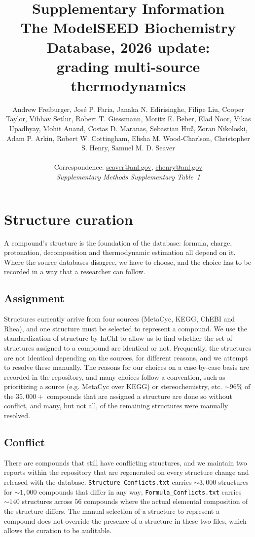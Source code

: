 \documentclass[11pt]{article}
\title{Supplementary Information\\[0.35em]
\large The ModelSEED Biochemistry Database, 2026 update:\\
grading multi-source thermodynamics}
\author{\begin{minipage}{0.86\textwidth}\centering\normalsize
Andrew Freiburger, Jos\'e P. Faria, Janaka N. Edirisinghe,
Filipe Liu, Cooper Taylor, Vibhav Setlur, Robert T. Giessmann, Moritz E. Beber,
Elad Noor, Vikas Upadhyay, Mohit Anand, Costas D. Maranas, Sebastian Hu{\ss},
Zoran Nikoloski, Adam P. Arkin, Robert W. Cottingham, Elisha M. Wood-Charlson,
Christopher S. Henry, Samuel M. D. Seaver
\end{minipage}\\[0.9em]
\small Correspondence: \href{mailto:seaver@anl.gov}{seaver@anl.gov},
\href{mailto:chenry@anl.gov}{chenry@anl.gov}\\[0.35em]
\small\itshape Supplementary Methods \DIFdelbegin \DIFdel{S1--S4 and }\DIFdelend \DIFaddbegin \DIFadd{S1--S5, }\DIFaddend Supplementary Table~1 \DIFaddbegin \DIFadd{and Supplementary Figure~S1}\DIFaddend }
\date{}
\begin{document}
\maketitle

\section{Structure curation}\label{sec:s1}

A compound's structure is the foundation of the database: formula, charge, protonation, decomposition and thermodynamic estimation all depend on it. Where the source databases disagree, we have to choose, and the choice has to be recorded in a way that a researcher can follow.

\subsection{Assignment} Structures currently arrive from four sources (MetaCyc, KEGG, ChEBI and Rhea), and one structure must be selected to represent a compound. We use the standardization of structure by InChI to allow us to find whether the set of structures assigned to a compound are identical or not. Frequently, the structures are not identical depending on the sources, for different reasons, and we attempt to resolve these manually. The reasons for our choices on a case-by-case basis are recorded in the repository, and many choices follow a convention, such as prioritizing a source (e.g. MetaCyc over KEGG) or stereochemistry, etc. $\sim96\%$ of the $35,000+$ compounds that are assigned a structure are done so without conflict, and many, but not all, of the remaining structures were manually resolved.

\subsection{Conflict} There are compounds that still have conflicting structures, and we maintain two reports within the repository that are regenerated on every structure change and released with the database. \texttt{Structure\_Conflicts.txt} carries $\sim3,000$ structures for $\sim1,000$ compounds that differ in any way; \texttt{Formula\_Conflicts.txt} carries $\sim140$ structures across $56$ compounds where the actual elemental composition of the structure differs. The manual selection of a structure to represent a compound does not override the presence of a structure in these two files, which allows the curation to be auditable.
\end{document}
